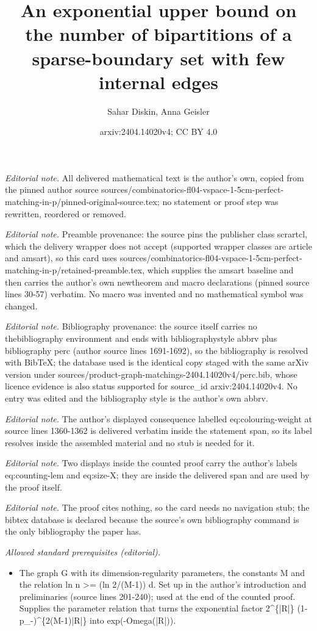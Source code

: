 \documentclass[10pt,a4paper]{amsart}
\title{An exponential upper bound on the number of bipartitions of a sparse-boundary set with few internal edges}
\author{Sahar Diskin, Anna Geisler}
\date{arxiv:2404.14020v4; CC BY 4.0}
\begin{document}
\maketitle
\noindent\textit{Editorial note.} All delivered mathematical text is the author's own, copied from the pinned author source sources/combinatorics-fl04-vspace-1-5cm-perfect-matching-in-p/pinned-original-source.tex; no statement or proof step was rewritten, reordered or removed.\par\medskip
\noindent\textit{Editorial note.} Preamble provenance: the source pins the publisher class scrartcl, which the delivery wrapper does not accept (supported wrapper classes are article and amsart), so this card uses sources/combinatorics-fl04-vspace-1-5cm-perfect-matching-in-p/retained-preamble.tex, which supplies the amsart baseline and then carries the author's own newtheorem and macro declarations (pinned source lines 30-57) verbatim. No macro was invented and no mathematical symbol was changed.\par\medskip
\noindent\textit{Editorial note.} Bibliography provenance: the source itself carries no thebibliography environment and ends with bibliographystyle abbrv plus bibliography perc (author source lines 1691-1692), so the bibliography is resolved with BibTeX; the database used is the identical copy staged with the same arXiv version under sources/product-graph-matchings-2404.14020v4/perc.bib, whose licence evidence is also status supported for source\_id arxiv:2404.14020v4. No entry was edited and the bibliography style is the author's own abbrv.\par\medskip
\noindent\textit{Editorial note.} The author's displayed consequence labelled eq:colouring-weight at source lines 1360-1362 is delivered verbatim inside the statement span, so its label resolves inside the assembled material and no stub is needed for it.\par\medskip
\noindent\textit{Editorial note.} Two displays inside the counted proof carry the author's labels eq:counting-lem and eq:size-X; they are inside the delivered span and are used by the proof itself.\par\medskip
\noindent\textit{Editorial note.} The proof cites nothing, so the card needs no navigation stub; the bibtex database is declared because the source's own bibliography command is the only bibliography the paper has.\par\medskip
\noindent\textit{Allowed standard prerequisites (editorial).}\begin{itemize}
\item The graph G with its dimension-regularity parameters, the constants M and the relation ln n >= (ln 2/(M-1)) d. Set up in the author's introduction and preliminaries (source lines 201-240); used at the end of the counted proof. Supplies the parameter relation that turns the exponential factor 2\textasciicircum{}\{|R|\} (1-p\_-)\textasciicircum{}\{2(M-1)|R|\} into exp(-Omega(|R|)).
\end{itemize}\medskip
\end{document}
